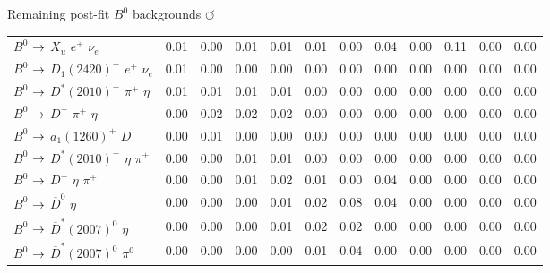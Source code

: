 \documentclass[xcolor=dvipsnames]{beamer}
\begin{document}
\begin{frame}{Remaining post-fit $B^0$ backgrounds \hyperlink{frame:A}{$\circlearrowleft$}}
{{\begin{tabular}{lrrrrrrrrrrr}
      $B^{0}$ $\rightarrow$ $X_u$ $e^{+}$ $\nu_{e}$                     &         0.01 &         0.00 &         0.01 &         0.01 &         0.01 &         0.00 &         0.04 &         0.00 &         0.11 &         0.00 &         0.00 \\
      $B^{0}$ $\rightarrow$ $D_{1}(2420)^{-}$ $e^{+}$ $\nu_{e}$       &         0.01 &         0.00 &         0.00 &         0.00 &         0.00 &         0.00 &         0.00 &         0.00 &         0.00 &         0.00 &         0.00 \\
      $B^{0}$ $\rightarrow$ $D^{*}(2010)^{-}$ $\pi^{+}$ $\eta$        &         0.01 &         0.01 &         0.01 &         0.01 &         0.00 &         0.00 &         0.00 &         0.00 &         0.00 &         0.00 &         0.00 \\
      $B^{0}$ $\rightarrow$ $D^{-}$ $\pi^{+}$ $\eta$                  &         0.00 &         0.02 &         0.02 &         0.02 &         0.00 &         0.00 &         0.00 &         0.00 &         0.00 &         0.00 &         0.00 \\
      $B^{0}$ $\rightarrow$ $a_{1}(1260)^{+}$ $D^{-}$                 &         0.00 &         0.01 &         0.00 &         0.00 &         0.00 &         0.00 &         0.00 &         0.00 &         0.00 &         0.00 &         0.00 \\
      $B^{0}$ $\rightarrow$ $D^{*}(2010)^{-}$ $\eta$ $\pi^{+}$        &         0.00 &         0.00 &         0.01 &         0.01 &         0.00 &         0.00 &         0.00 &         0.00 &         0.00 &         0.00 &         0.00 \\
      $B^{0}$ $\rightarrow$ $D^{-}$ $\eta$ $\pi^{+}$                  &         0.00 &         0.00 &         0.01 &         0.02 &         0.01 &         0.00 &         0.04 &         0.00 &         0.00 &         0.00 &         0.00 \\
      $B^{0}$ $\rightarrow$ $\overline{D}^{0}$ $\eta$                 &         0.00 &         0.00 &         0.00 &         0.01 &         0.02 &         0.08 &         0.04 &         0.00 &         0.00 &         0.00 &         0.00 \\
      $B^{0}$ $\rightarrow$ $\overline{D}^{*}(2007)^{0}$ $\eta$       &         0.00 &         0.00 &         0.00 &         0.01 &         0.02 &         0.02 &         0.00 &         0.00 &         0.00 &         0.00 &         0.00 \\
      $B^{0}$ $\rightarrow$ $\overline{D}^{*}(2007)^{0}$ $\pi^{0}$    &         0.00 &         0.00 &         0.00 &         0.00 &         0.01 &         0.04 &         0.00 &         0.00 &         0.00 &         0.00 &         0.00 \\

\end{tabular}}}
\end{frame}
\end{document}

